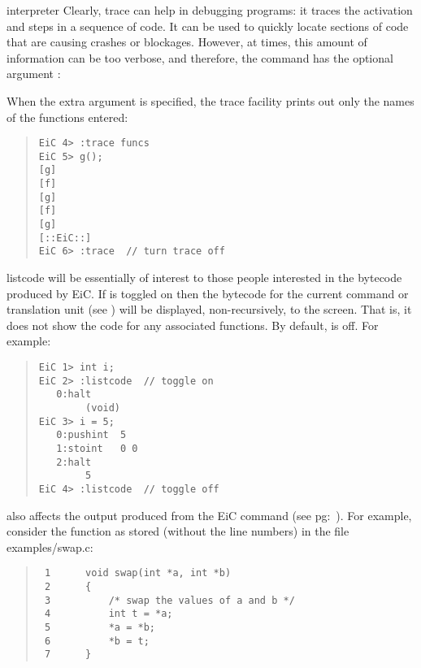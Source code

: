 \begin{Ventry} {interpreter}
Clearly, trace can help in debugging 
programs: it traces the activation and steps in a sequence of code. It
can be used to quickly locate sections of code that are causing
crashes or blockages. However, at times, this amount of information
can be too verbose, and therefore, the  command has the
optional argument :
\begin{quote}
\end{quote}

When the extra argument is specified, the trace facility
prints out only the names of the functions entered:

\begin{quote}
\begin{verbatim}
EiC 4> :trace funcs
EiC 5> g(); 
[g] 
[f] 
[g] 
[f] 
[g] 
[::EiC::] 
EiC 6> :trace  // turn trace off
\end{verbatim}
\end{quote}

\item[listcode]
\label{item:listcode}  
 will be essentially of interest to those people interested in the bytecode 
produced by EiC. If  is toggled on then the bytecode for
the current command or translation unit (see
) will be displayed, non-recursively, to the
screen.  That is, it does not show the code for any associated
functions. By default,  is off. For example:

\begin{quote}
\begin{verbatim}
EiC 1> int i;
EiC 2> :listcode  // toggle on
   0:halt                
        (void)
EiC 3> i = 5;
   0:pushint  5          
   1:stoint   0 0        
   2:halt                
        5
EiC 4> :listcode  // toggle off
\end{verbatim}
\end{quote}

 also affects the output produced from the EiC command
 (see pg:~\pageref{item:show}). For example,
 consider the  function as stored (without the line numbers)
in the file examples/swap.c:

\begin{quote}
\begin{verbatim}
 1      void swap(int *a, int *b)
 2      {
 3          /* swap the values of a and b */
 4          int t = *a;
 5          *a = *b;
 6          *b = t;
 7      }
\end{verbatim}
\end{quote}


\end{Ventry}

